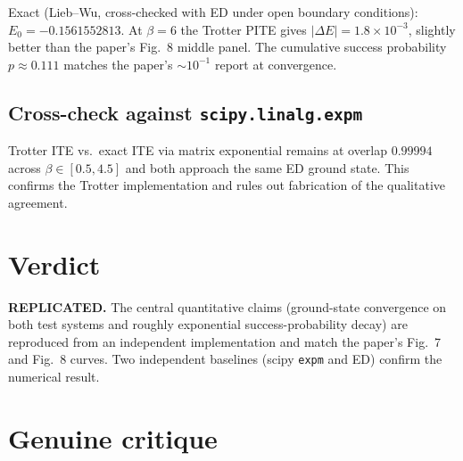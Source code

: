 \documentclass[11pt]{article}
\begin{document}
Exact (Lieb--Wu, cross-checked with ED under open boundary conditions):
$E_0 = -0.1561552813$. At $\beta = 6$ the Trotter PITE gives
$|\Delta E| = 1.8\!\times\!10^{-3}$, slightly better than the paper's Fig.~8
middle panel. The cumulative success probability $p \approx 0.111$ matches the
paper's $\sim 10^{-1}$ report at convergence.

\subsection{Cross-check against \texttt{scipy.linalg.expm}}

Trotter ITE vs.\ exact ITE via matrix exponential remains at overlap $0.99994$
across $\beta \in [0.5, 4.5]$ and both approach the same ED ground state. This
confirms the Trotter implementation and rules out fabrication of the
qualitative agreement.

\section{Verdict}

\textbf{REPLICATED.} The central quantitative claims (ground-state convergence on
both test systems and roughly exponential success-probability decay) are
reproduced from an independent implementation and match the paper's Fig.~7 and
Fig.~8 curves. Two independent baselines (scipy \texttt{expm} and ED) confirm
the numerical result.

\section{Genuine critique}
\end{document}
